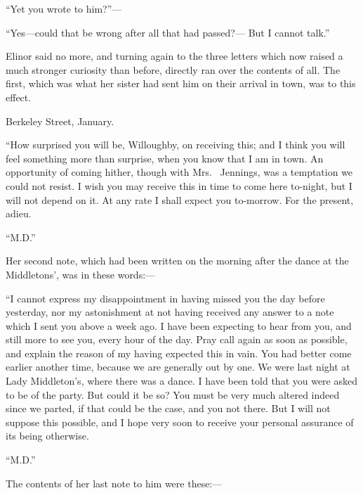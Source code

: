 ``Yet you wrote to him?''---%

``Yes---could that be wrong after all that had passed?---%
But I cannot talk.''

Elinor said no more, and turning again to the three
letters which now raised a much stronger curiosity
than before, directly ran over the contents of all.
The first, which was what her sister had sent him
on their arrival in town, was to this effect.

\bigskip
                         Berkeley Street, January.
\medskip

     ``How surprised you will be, Willoughby, on
     receiving this; and I think you will feel something
     more than surprise, when you know that I am in town.
     An opportunity of coming hither, though with Mrs.\ %
     Jennings, was a temptation we could not resist.
     I wish you may receive this in time to come here
     to-night, but I will not depend on it.  At any rate
     I shall expect you to-morrow. For the present, adieu.

\medskip
                                             ``M.D.''
\bigskip

Her second note, which had been written on the morning
after the dance at the Middletons', was in these words:---%

\bigskip
     ``I cannot express my disappointment in having
     missed you the day before yesterday, nor my astonishment
     at not having received any answer to a note which
     I sent you above a week ago.  I have been expecting
     to hear from you, and still more to see you, every
     hour of the day.  Pray call again as soon as possible,
     and explain the reason of my having expected this
     in vain.  You had better come earlier another time,
     because we are generally out by one.  We were last
     night at Lady Middleton's, where there was a dance.
     I have been told that you were asked to be of the
     party.  But could it be so?  You must be very much
     altered indeed since we parted, if that could be
     the case, and you not there.  But I will not suppose
     this possible, and I hope very soon to receive your
     personal assurance of its being otherwise.

\medskip
                                            ``M.D.''
\bigskip

The contents of her last note to him were these:---%

